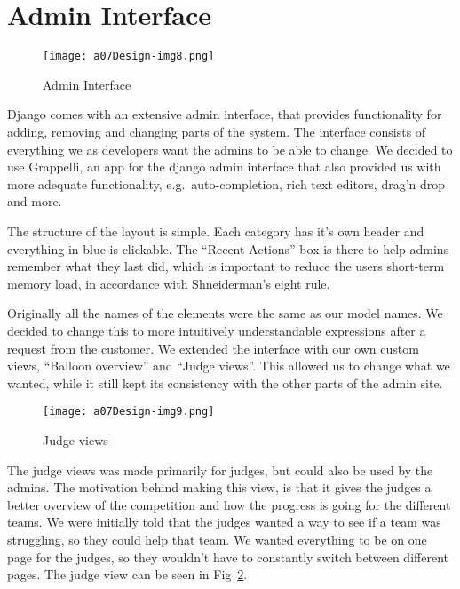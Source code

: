 \section{Admin Interface}

 \begin{figure}[h!]
	\texttt{[image: a07Design-img8.png]} 
	\caption{Admin Interface}
	\label{fig:adminInterface}
\end{figure}

Django comes with an
extensive admin interface, that provides functionality for adding,
removing and changing parts of the system. The interface consists
of everything we as developers want the admins to be able to change.
We decided to use
Grappelli, an app for the django admin interface that also provided us
with more adequate functionality, e.g.\ auto-completion, rich text
editors, drag'n drop and more.

The structure of the layout is simple. Each category has
it's own header and everything in blue is clickable.
The ``Recent Actions'' box is there
to help admins remember what they last did, which is important to
reduce the users short-term memory load, in accordance with
Shneiderman's eight rule.

Originally all the names of the elements were the same as our model
names. We decided to change this to more intuitively understandable
expressions after a request from the customer.
We extended the interface with our own custom views, ``Balloon overview'' and ``Judge views''. 
This allowed us to change 
what we wanted, while it still kept its consistency with the other parts 
of the admin site.



 \begin{figure}[h!]
	\texttt{[image: a07Design-img9.png]} 
	\caption{Judge views}
	\label{fig:judge}
\end{figure}

The judge views was made primarily for judges, but could also be used
by the admins. The motivation behind making this view, is that it gives
the judges a better overview of the competition and how the progress
is going for the different teams. We were initially told that the
judges wanted a way to see if a team was struggling, so they could help
that team. We wanted everything to be on one page for the judges, so they
wouldn't have to constantly switch between different pages. The judge view can be seen in Fig~\ref{fig:judge}.

